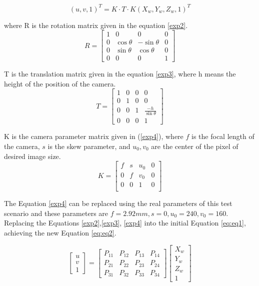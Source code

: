 \begin{equation}
    (u,v,1)^T = K\cdot T \cdot K (X_w,Y_w, Z_w,1)^T
    \label{eq:eq1}
\end{equation}

where R is the rotation matrix given in the equation \ref{exp2}.
\begin{equation} \label{exp2}
R=
\begin{bmatrix}
1 & 0 & 0 & 0\\
0 & \cos{\theta} & -\sin{\theta} & 0\\
0 & \sin{\theta} & \cos{\theta} & 0\\
0 & 0 & 0 & 1
\end{bmatrix}
\end{equation}
\par

T is the translation matrix given in the equation \ref{exp3}, where h means the height of the position of the camera.
\begin{equation} \label{exp3}
T=
\begin{bmatrix}
1 & 0 & 0 & 0\\
0 & 1 & 0 & 0\\
0 & 0 & 1 & \frac{-h}{\sin{\theta}}\\
0 & 0 & 0 & 1
\end{bmatrix}
\end{equation}


\par
K is the camera parameter matrix given in (\ref{exp4}), where $f$ is the focal length of the camera, $s$ is the skew parameter, and $u_0, v_0$ are the center of the pixel of desired image size. 
\begin{equation} \label{exp4}
K =
\begin{bmatrix}
f & s & u_0 & 0\\
0 & f & v_0 & 0\\
0 & 0 & 1 & 0\\
\end{bmatrix}
\end{equation}

The Equation \ref{exp4} can be replaced using the real parameters of this test scenario and these parameters are $f = 2.92 mm, s=0, u_0=240, v_0=160$. Replacing the Equations \ref{exp2},\ref{exp3}, \ref{exp4} into the initial Equation \ref{eq:eq1}, achieving the new Equation \ref{eq:eq2}.

\begin{equation}
    \begin{bmatrix}
u\\ 
v\\ 
1
\end{bmatrix}
=\begin{bmatrix}
P_{11} & P_{12} & P_{13} & P_{14}\\ 
P_{21} & P_{22} & P_{23} & P_{24}\\ 
P_{31} & P_{32} & P_{33} & P_{34}
\end{bmatrix}
\begin{bmatrix}
X_w\\ 
Y_w\\ 
Z_w\\
1
\end{bmatrix}
\label{eq:eq2}
\end{equation}


